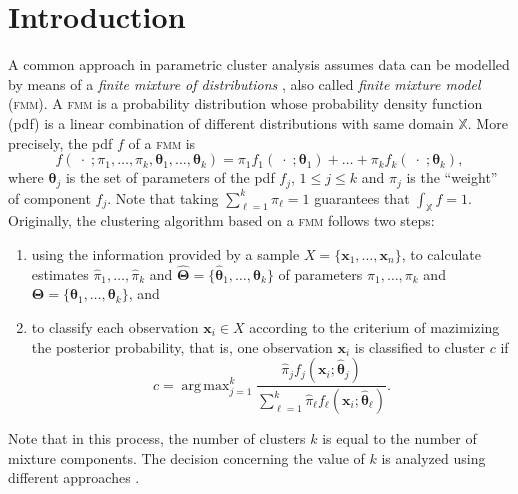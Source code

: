 \documentclass[submit]{smj}
\DeclareMathOperator*{\argmax}{arg\,max}
\theoremstyle{definition}
\newcommand{\m}[1]{\boldsymbol{#1}}
\newcommand{\fmm}{\textsc{fmm}\xspace}
\begin{document}



\maketitle

\section{Introduction}


A common approach in parametric cluster analysis assumes data can be modelled by means of a \emph{finite mixture of distributions} \citep{fraley2002model}, also called \emph{finite mixture model} (\fmm). A \fmm is a probability distribution whose probability density function (pdf) is a linear combination of different distributions with same domain $\mathbb{X}$. More precisely, the pdf $f$ of a \fmm is
\begin{equation}\label{mixt}
f(\;\cdot\; ; \pi_1, \dots, \pi_k, \m\theta_1, \dots, \m\theta_k) = \pi_1 f_1(\;\cdot\; ; \m\theta_1) + \dots + \pi_k f_k(\;\cdot\; ; \m\theta_k),
\end{equation}
where $\m\theta_j$ is the set of parameters of the pdf $f_j$, $1\leq j \leq k$ and $\pi_j$ is the ``weight'' of component $f_j$. Note that taking $\sum_{\ell = 1}^k \pi_\ell = 1$ guarantees that  $\int_{\mathbb{X}}f = 1$. Originally, the clustering algorithm based on a \fmm follows two steps:
\begin{enumerate}
\item using the information provided by a sample $X=\{\m x_1, \dots, \m x_n\}$, to calculate estimates $\hat{\pi}_1, \dots, \hat{\pi}_k$ and $\hat{\m\Theta}=\{\hat{\m\theta}_1, \dots, \hat{\m\theta}_k\}$ of parameters $\pi_1, \dots, \pi_k$ and $\m\Theta=\{\m\theta_1, \dots, \m\theta_k\}$, and
\item to classify each observation $\m x_i \in X$ according to the criterium of mazimizing the posterior probability, that is, one observation $\m x_i$ is classified to cluster $c$ if
\begin{equation}\label{map_criteria}
c=\argmax_{j=1}^k \frac{ \hat{\pi}_j f_j(\m x_i ; \hat{\m\theta}_j) }{\sum_{\ell=1}^k \hat{\pi}_\ell f_\ell(\m x_i ; \hat{\m\theta}_\ell) }.
\end{equation}
\end{enumerate}
Note that in this process, the number of clusters $k$ is equal to the number of mixture components. The decision concerning the value of $k$ is analyzed using different approaches \citep{mclachlan2014components}.
\end{document}
